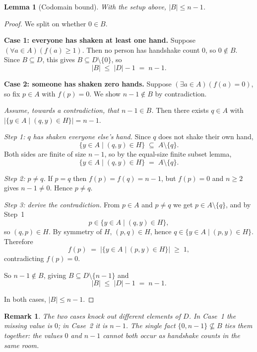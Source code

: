 \documentclass[11pt]{article}
\theoremstyle{defstyle}
\theoremstyle{thmstyle}
\newtheorem{lemma}[theorem]{Lemma}
\theoremstyle{notstyle}
\newtheorem*{remark}{Remark}
\theoremstyle{cautionstyle}
\newcommand{\hcount}[1]{\bigl|\{y \in A \mid (#1, y) \in H\}\bigr|}
\begin{document}
\begin{thmbox}
\begin{lemma}[Codomain bound]
With the setup above, $|B| \leq n - 1$.
\end{lemma}
\begin{proof}
We split on whether $0 \in B$.

\medskip
\noindent\textbf{Case 1: everyone has shaken at least one hand.}
Suppose $(\forall a \in A)(f(a) \geq 1)$. Then no person has handshake
count $0$, so $0 \notin B$. Since $B \subseteq D$, this gives
$B \subseteq D \setminus \{0\}$, so
\[
  |B| \;\leq\; |D| - 1 \;=\; n - 1.
\]

\medskip
\noindent\textbf{Case 2: someone has shaken zero hands.}
Suppose $(\exists a \in A)(f(a) = 0)$, so fix $p \in A$ with $f(p) = 0$.
We show $n - 1 \notin B$ by contradiction.

\smallskip
\noindent\emph{Assume, towards a contradiction, that $n - 1 \in B$.}
Then there exists $q \in A$ with $\hcount{q} = n - 1$.

\smallskip
\noindent\emph{Step 1: $q$ has shaken everyone else's hand.} Since $q$
does not shake their own hand,
\[
  \{y \in A \mid (q,y) \in H\} \;\subseteq\; A \setminus \{q\}.
\]
Both sides are finite of size $n - 1$, so by the equal-size finite
subset lemma,
\[
  \{y \in A \mid (q,y) \in H\} \;=\; A \setminus \{q\}.
\]

\medskip
\noindent\emph{Step 2: $p \neq q$.} If $p = q$ then
$f(p) = f(q) = n - 1$, but $f(p) = 0$ and $n \geq 2$ gives
$n - 1 \neq 0$. Hence $p \neq q$.

\medskip
\noindent\emph{Step 3: derive the contradiction.} From $p \in A$ and
$p \neq q$ we get $p \in A \setminus \{q\}$, and by Step~1
\[
  p \in \{y \in A \mid (q, y) \in H\},
\]
so $(q, p) \in H$. By symmetry of $H$, $(p, q) \in H$, hence
$q \in \{y \in A \mid (p, y) \in H\}$. Therefore
\[
  f(p) \;=\; \hcount{p} \;\geq\; 1,
\]
contradicting $f(p) = 0$. \quad\lightning

\medskip
\noindent So $n - 1 \notin B$, giving $B \subseteq D \setminus \{n-1\}$
and
\[
  |B| \;\leq\; |D| - 1 \;=\; n - 1.
\]

\medskip
In both cases, $|B| \leq n - 1$.
\end{proof}
\end{thmbox}

\begin{notebox}
\begin{remark}
The two cases knock out different elements of $D$. In Case~1 the missing
value is $0$; in Case~2 it is $n - 1$. The single fact
$\{0, n-1\} \not\subseteq B$ ties them together: the values $0$ and
$n - 1$ cannot both occur as handshake counts in the same room.
\end{remark}
\end{notebox}
\end{document}
